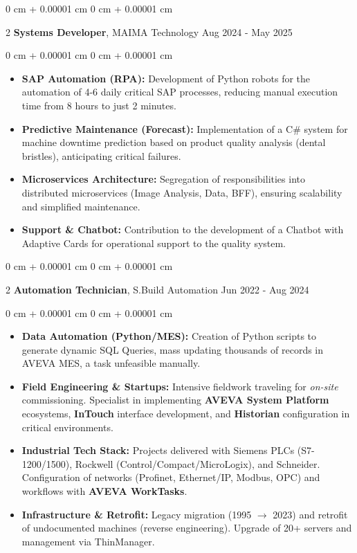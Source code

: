 \documentclass[10pt, letterpaper]{article}
\newenvironment{highlights}{ \begin{itemize}[ topsep=0.10 cm, parsep=0.10 cm, partopsep=0pt,
itemsep=0pt, leftmargin=0 cm + 10pt ] }{ \end{itemize} } %
\newenvironment{onecolentry}{ \begin{adjustwidth}{ 0 cm + 0.00001 cm }{ 0 cm + 0.00001 cm }
}{ \end{adjustwidth} } %
\newenvironment{twocolentry}[2][]{ \onecolentry \def\secondColumn{#2} \setcolumnwidth{\fill, 4.5 cm}
\begin{paracol}{2} }{ \switchcolumn \raggedleft \secondColumn \end{paracol}
\endonecolentry } %
\begin{document}
	\vspace{0.2 cm}
	
	\begin{twocolentry}
		{ Aug 2024 - May 2025 } \textbf{Systems Developer}, MAIMA Technology
	\end{twocolentry}
	
	\vspace{0.10 cm}
	\begin{onecolentry}
		\begin{highlights}
			\item \textbf{SAP Automation (RPA):} Development of Python robots for the automation of 4-6 daily critical SAP processes, reducing manual execution time from 8 hours to just 2 minutes.
			\item \textbf{Predictive Maintenance (Forecast):} Implementation of a C\# system for machine downtime prediction based on product quality analysis (dental bristles), anticipating critical failures.
            \item \textbf{Microservices Architecture:} Segregation of responsibilities into distributed microservices (Image Analysis, Data, BFF), ensuring scalability and simplified maintenance.
            \item \textbf{Support \& Chatbot:} Contribution to the development of a Chatbot with Adaptive Cards for operational support to the quality system.
		\end{highlights}
	\end{onecolentry}
	
	\vspace{0.2 cm}
	
	\begin{twocolentry}
		{ Jun 2022 - Aug 2024 } \textbf{Automation Technician}, S.Build Automation
	\end{twocolentry}
	
	\vspace{0.10 cm}
	\begin{onecolentry}
		\begin{highlights}
			\item \textbf{Data Automation (Python/MES):} Creation of Python scripts to generate dynamic SQL Queries, mass updating thousands of records in AVEVA MES, a task unfeasible manually.
            \item \textbf{Field Engineering \& Startups:} Intensive fieldwork traveling for \textit{on-site} commissioning. Specialist in implementing \textbf{AVEVA System Platform} ecosystems, \textbf{InTouch} interface development, and \textbf{Historian} configuration in critical environments.
            \item \textbf{Industrial Tech Stack:} Projects delivered with Siemens PLCs (S7-1200/1500), Rockwell (Control/Compact/MicroLogix), and Schneider. Configuration of networks (Profinet, Ethernet/IP, Modbus, OPC) and workflows with \textbf{AVEVA WorkTasks}.
            \item \textbf{Infrastructure \& Retrofit:} Legacy migration (1995 $\rightarrow$ 2023) and retrofit of undocumented machines (reverse engineering). Upgrade of 20+ servers and management via ThinManager.
		\end{highlights}
	\end{onecolentry}
\end{document}
